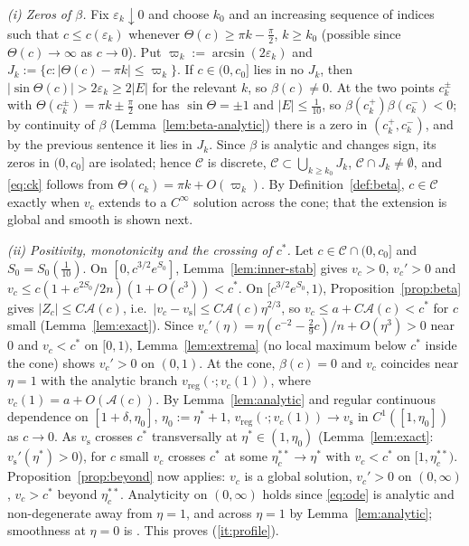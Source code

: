 \documentclass[11pt,a4paper]{amsart}
\theoremstyle{definition}
\theoremstyle{remark}
\newcommand{\eps}{\varepsilon}
\newcommand{\cstar}{c^{*}}
\newcommand{\vs}{v_{\mathrm{s}}}
\newcommand{\vreg}{v_{\mathrm{reg}}}
\begin{document}
\emph{(i) Zeros of $\beta$.}  Fix $\eps_k\downarrow0$ and choose $k_0$ and an increasing sequence of indices such that $c\le c(\eps_k)$ whenever $\Theta(c)\ge\pi k-\frac\pi2$, $k\ge k_0$ (possible since $\Theta(c)\to\infty$ as $c\to0$).  Put $\varpi_k:=\arcsin(2\eps_k)$ and $J_k:=\{c:|\Theta(c)-\pi k|\le\varpi_k\}$.  If $c\in(0,c_0]$ lies in no $J_k$, then $|\sin\Theta(c)|>2\eps_k\ge2|E|$ for the relevant $k$, so $\beta(c)\ne0$.  At the two points $c^\pm_k$ with $\Theta(c_k^\pm)=\pi k\pm\frac\pi2$ one has $\sin\Theta=\pm1$ and $|E|\le\frac1{10}$, so $\beta(c_k^+)\beta(c_k^-)<0$; by continuity of $\beta$ (Lemma~\ref{lem:beta-analytic}) there is a zero in $(c_k^+,c_k^-)$, and by the previous sentence it lies in $J_k$.  Since $\beta$ is analytic and changes sign, its zeros in $(0,c_0]$ are isolated; hence $\mathcal C$ is discrete, $\mathcal C\subset\bigcup_{k\ge k_0}J_k$, $\mathcal C\cap J_k\ne\emptyset$, and \eqref{eq:ck} follows from $\Theta(c_k)=\pi k+O(\varpi_k)$.  By Definition~\ref{def:beta}, $c\in\mathcal C$ exactly when $v_c$ extends to a $C^\infty$ solution across the cone; that the extension is global and smooth is shown next.

\emph{(ii) Positivity, monotonicity and the crossing of $\cstar$.}  Let $c\in\mathcal C\cap(0,c_0]$ and $S_0=S_0(\frac1{10})$.  On $[0,c^{3/2}e^{S_0}]$, Lemma~\ref{lem:inner-stab} gives $v_c>0$, $v_c'>0$ and $v_c\le c(1+e^{2S_0}/2n)(1+O(c^3))<\cstar$.  On $[c^{3/2}e^{S_0},1)$, Proposition~\ref{prop:beta} gives $|Z_c|\le C\mathcal A(c)$, i.e.\ $|v_c-\vs|\le C\mathcal A(c)\eta^{2/3}$, so $v_c\le a+C\mathcal A(c)<\cstar$ for $c$ small (Lemma~\ref{lem:exact}).  Since $v_c'(\eta)=\eta(c^{-2}-\frac29c)/n+O(\eta^3)>0$ near $0$ and $v_c<\cstar$ on $[0,1)$, Lemma~\ref{lem:extrema} (no local maximum below $\cstar$ inside the cone) shows $v_c'>0$ on $(0,1)$.  At the cone, $\beta(c)=0$ and $v_c$ coincides near $\eta=1$ with the analytic branch $\vreg(\cdot;v_c(1))$, where $v_c(1)=a+O(\mathcal A(c))$.  By Lemma~\ref{lem:analytic} and regular continuous dependence on $[1+\delta,\eta_0]$, $\eta_0:=\eta^*+1$, $\vreg(\cdot;v_c(1))\to\vs$ in $C^1([1,\eta_0])$ as $c\to0$.  As $\vs$ crosses $\cstar$ transversally at $\eta^*\in(1,\eta_0)$ (Lemma~\ref{lem:exact}: $\vs'(\eta^*)>0$), for $c$ small $v_c$ crosses $\cstar$ at some $\eta^{**}_c\to\eta^*$ with $v_c<\cstar$ on $[1,\eta^{**}_c)$.  Proposition~\ref{prop:beyond} now applies: $v_c$ is a global solution, $v_c'>0$ on $(0,\infty)$, $v_c>\cstar$ beyond $\eta^{**}_c$.  Analyticity on $(0,\infty)$ holds since \eqref{eq:ode} is analytic and non-degenerate away from $\eta=1$, and across $\eta=1$ by Lemma~\ref{lem:analytic}; smoothness at $\eta=0$ is \cite[Lemma A.3]{GHL22}.  This proves (\ref{it:profile}).
\end{document}

